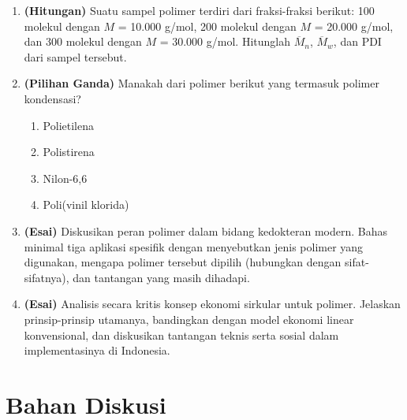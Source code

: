 \documentclass[12pt,a4paper,openany]{book}
\begin{document}
\begin{enumerate}[label=\textbf{\arabic*.}]
\item \textbf{(Hitungan)} Suatu sampel polimer terdiri dari fraksi-fraksi berikut: 100 molekul dengan $M$ = 10.000 g/mol, 200 molekul dengan $M$ = 20.000 g/mol, dan 300 molekul dengan $M$ = 30.000 g/mol. Hitunglah $\overline{M}_n$, $\overline{M}_w$, dan PDI dari sampel tersebut.

\item \textbf{(Pilihan Ganda)} Manakah dari polimer berikut yang termasuk polimer kondensasi?
\begin{enumerate}[label=(\alph*)]
  \item Polietilena
  \item Polistirena
  \item Nilon-6,6
  \item Poli(vinil klorida)
\end{enumerate}

\item \textbf{(Esai)} Diskusikan peran polimer dalam bidang kedokteran modern. Bahas minimal tiga aplikasi spesifik dengan menyebutkan jenis polimer yang digunakan, mengapa polimer tersebut dipilih (hubungkan dengan sifat-sifatnya), dan tantangan yang masih dihadapi.

\item \textbf{(Esai)} Analisis secara kritis konsep ekonomi sirkular untuk polimer. Jelaskan prinsip-prinsip utamanya, bandingkan dengan model ekonomi linear konvensional, dan diskusikan tantangan teknis serta sosial dalam implementasinya di Indonesia.

\end{enumerate}


\section{Bahan Diskusi}
\end{document}
